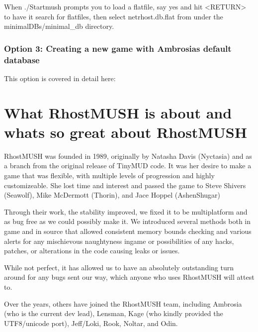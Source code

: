 \documentclass[letterpaper,10pt,english]{sphinxmanual}
\begin{document}
\sphinxAtStartPar
When ./Startmush prompts you to load a flatfile, say \textquotesingle{}yes\textquotesingle{} and hit \textless{}RETURN\textgreater{}
to have it search for flatfiles, then select netrhost.db.flat from under
the minimal\sphinxhyphen{}DBs/minimal\_db directory.


\subsection{Option 3: Creating a new game with Ambrosia\textquotesingle{}s default database}
\label{\detokenize{install:option-3-creating-a-new-game-with-ambrosia-s-default-database}}
\sphinxAtStartPar
This option is covered in detail here: {\hyperref[\detokenize{ambrosiadb:ambrosiadb-installation}]{}}


\chapter{What RhostMUSH is about and what\textquotesingle{}s so great about RhostMUSH}
\label{\detokenize{features:what-rhostmush-is-about-and-what-s-so-great-about-rhostmush}}\label{\detokenize{features::doc}}
\sphinxAtStartPar
RhostMUSH was founded in 1989, originally by Natasha Davis (Nyctasia) and as
a branch from the original release of TinyMUD code.  It was her desire to make
a game that was flexible, with multiple levels of progression and highly
customizeable.  She lost time and interest and passed the game to
Steve Shivers (Seawolf), Mike McDermott (Thorin), and Jace Hoppel (Ashen\sphinxhyphen{}Shugar)

\sphinxAtStartPar
Through their work, the stability improved, we fixed it to be multi\sphinxhyphen{}platform
and as bug free as we could possibly make it.  We introduced several methods both
in game and in source that allowed consistent memory bounds checking and
various alerts for any mischievous naughtyness in\sphinxhyphen{}game or possibilities of any
hacks, patches, or alterations in the code causing leaks or issues.

\sphinxAtStartPar
While not perfect, it has allowed us to have an absolutely outstanding
turn around for any bugs sent our way, which anyone who uses RhostMUSH will
attest to.

\sphinxAtStartPar
Over the years, others have joined the RhostMUSH team, including Ambrosia
(who is the current dev lead), Lensman, Kage (who kindly provided the
UTF8/unicode port), Jeff/Loki, Rook, Noltar, and Odin.
\end{document}
